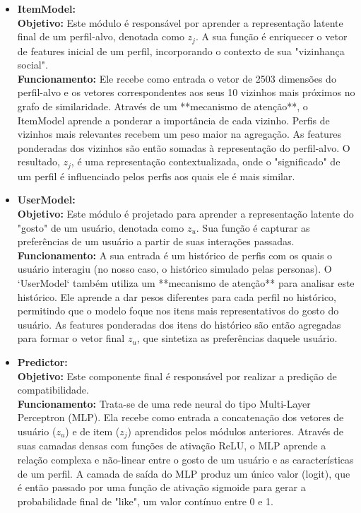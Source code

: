 \begin{itemize}
    \item \textbf{ItemModel:}
    \\ \textbf{Objetivo:} Este módulo é responsável por aprender a representação latente final de um perfil-alvo, denotada como $z_j$. A sua função é enriquecer o vetor de features inicial de um perfil, incorporando o contexto de sua "vizinhança social".
    \\ \textbf{Funcionamento:} Ele recebe como entrada o vetor de 2503 dimensões do perfil-alvo e os vetores correspondentes aos seus 10 vizinhos mais próximos no grafo de similaridade. Através de um **mecanismo de atenção**, o ItemModel aprende a ponderar a importância de cada vizinho. Perfis de vizinhos mais relevantes recebem um peso maior na agregação. As features ponderadas dos vizinhos são então somadas à representação do perfil-alvo. O resultado, $z_j$, é uma representação contextualizada, onde o "significado" de um perfil é influenciado pelos perfis aos quais ele é mais similar.

    \item \textbf{UserModel:}
    \\ \textbf{Objetivo:} Este módulo é projetado para aprender a representação latente do "gosto" de um usuário, denotada como $z_u$. Sua função é capturar as preferências de um usuário a partir de suas interações passadas.
    \\ \textbf{Funcionamento:} A sua entrada é um histórico de perfis com os quais o usuário interagiu (no nosso caso, o histórico simulado pelas personas). O `UserModel` também utiliza um **mecanismo de atenção** para analisar este histórico. Ele aprende a dar pesos diferentes para cada perfil no histórico, permitindo que o modelo foque nos itens mais representativos do gosto do usuário. As features ponderadas dos itens do histórico são então agregadas para formar o vetor final $z_u$, que sintetiza as preferências daquele usuário.

    \item \textbf{Predictor:}
    \\ \textbf{Objetivo:} Este componente final é responsável por realizar a predição de compatibilidade.
    \\ \textbf{Funcionamento:} Trata-se de uma rede neural do tipo Multi-Layer Perceptron (MLP). Ela recebe como entrada a concatenação dos vetores de usuário ($z_u$) e de item ($z_j$) aprendidos pelos módulos anteriores. Através de suas camadas densas com funções de ativação ReLU, o MLP aprende a relação complexa e não-linear entre o gosto de um usuário e as características de um perfil. A camada de saída do MLP produz um único valor (logit), que é então passado por uma função de ativação sigmoide para gerar a probabilidade final de "like", um valor contínuo entre 0 e 1.
\end{itemize}

